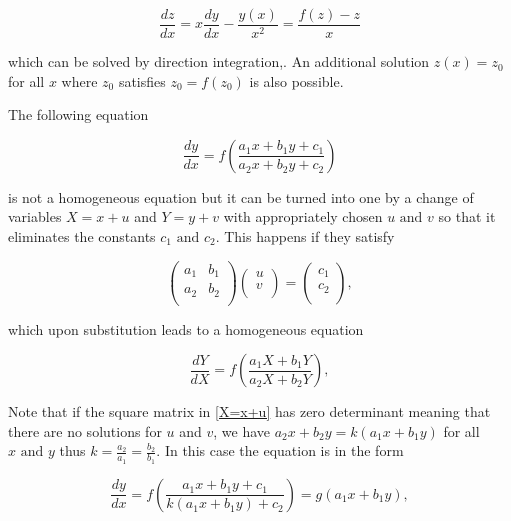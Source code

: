 \documentclass[english,a4paper,12pt]{report}
\begin{document}
\begin{equation}
    \frac{dz}{dx} = x\frac{dy}{dx} - \frac{y(x)}{x^2} = \frac{f(z)-z}{x}  
\end{equation}

which can be solved by direction integration,. An additional solution \(z(x) = z_0 \) for all \(x\) where \(z_0 \) satisfies \(z_0 = f(z_0 )\) is also possible.

The following equation

\begin{equation}
    \frac{dy}{dx} = f\left(\frac{a_1 x+b_1 y+c_1 }{a_2 x+b_2 y+c_2 } \right)
\end{equation}

is not a homogeneous equation but it can be turned into one by a change of variables \(X = x+u\) and \(Y = y+v\) with appropriately chosen \(u\text { and } v\) so that it eliminates the constants \(c_1 \text { and } c_2 \). This happens if they satisfy 

\begin{equation} \label{X=x+u} 
    \begin{pmatrix}
        a_1  &  b_1  \\
        a_2  &  b_2  \\
    \end{pmatrix} \begin{pmatrix}
         u \\
         v \\
    \end{pmatrix} = \begin{pmatrix}
         c_1  \\
        c_2   \\
    \end{pmatrix} ,
\end{equation}

which upon substitution leads to a homogeneous equation

\begin{equation}
    \frac{dY}{dX} = f\left( \frac{a_1 X+b_1 Y}{a_2 X+b_2 Y}  \right),
\end{equation}

Note that if the square matrix in \cref{X=x+u} has zero determinant meaning that there are no solutions for \(u\) and \(v\), we have \(a_2 x+b_2 y = k(a_1 x+b_1 y)\) for all \(x \text { and } y\) thus \(\displaystyle k=\frac{a_2 }{a_1  } = \frac{b_2 }{b_1 } \). In this case the equation is in the form

\begin{equation}
    \frac{dy}{dx} = f\left( \frac{a_1 x+b_1 y+c_1 }{k(a_1 x+b_1 y)+c_2 }  \right)= g(a_1 x+b_1 y),
\end{equation}
\end{document}
